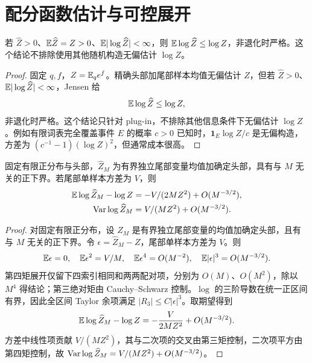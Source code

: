 \section{配分函数估计与可控展开}
\begin{proposition}
若 $\widehat Z>0$、$\mathbb E\widehat Z=Z>0$、$\mathbb E|\log\widehat Z|<\infty$，则 $\mathbb E\log\widehat Z\le\log Z$，非退化时严格。这个结论不排除使用其他随机构造无偏估计 $\log Z$。
\end{proposition}
\begin{proof}
固定 $q,f$，$Z=\mathbb E_qe^f$。精确头部加尾部样本均值无偏估计 $Z$，但若 $\widehat Z>0$、$\mathbb E|\log\widehat Z|<\infty$，Jensen 给
\begin{equation}
\mathbb E\log\widehat Z\le\log Z,
\end{equation}
非退化时严格。这个结论只针对 plug-in，不排除其他信息条件下无偏估计 $\log Z$。例如有限词表完全覆盖事件 $E$ 的概率 $c>0$ 已知时，$\mathbf1_E\log Z/c$ 是无偏构造，方差为 $(c^{-1}-1)(\log Z)^2$，但通常成本很高。
\end{proof}

\begin{theorem}
固定有限正分布与头部，$\widehat Z_M$ 为有界独立尾部变量均值加确定头部，具有与 $M$ 无关的正下界。若尾部单样本方差为 $V$，则
\begin{align}
\mathbb E\log\widehat Z_M-\log Z&=-V/(2MZ^2)+O(M^{-3/2}),\\
\operatorname{Var}\log\widehat Z_M&=V/(MZ^2)+O(M^{-3/2}).
\end{align}
\end{theorem}
\begin{proof}
对固定有限正分布，设 $\widehat Z_M$ 是有界独立尾部变量的均值加确定头部，且有与 $M$ 无关的正下界。令 $\epsilon=\widehat Z_M-Z$，尾部单样本方差为 $V$。则
\begin{equation}
\mathbb E\epsilon=0,\quad \mathbb E\epsilon^2=V/M,\quad
\mathbb E\epsilon^4=O(M^{-2}),\quad \mathbb E|\epsilon|^3=O(M^{-3/2}).
\end{equation}
第四矩展开仅留下四索引相同和两两配对项，分别为 $O(M)$、$O(M^2)$，除以 $M^4$ 得结论；第三绝对矩由 Cauchy--Schwarz 控制。$\log$ 的三阶导数在统一正区间有界，因此全区间 Taylor 余项满足 $|R_3|\le C|\epsilon|^3$。取期望得到
\begin{equation}
\mathbb E\log\widehat Z_M-\log Z=-\frac{V}{2MZ^2}+O(M^{-3/2}).
\end{equation}
方差中线性项贡献 $V/(MZ^2)$，其与二次项的交叉由第三矩控制，二次项平方由第四矩控制，故 $\operatorname{Var}\log\widehat Z_M=V/(MZ^2)+O(M^{-3/2})$。
\end{proof}

